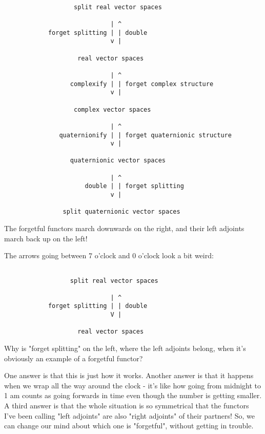 \begin{verbatim}

                   split real vector spaces
  
                             | ^
            forget splitting | | double
                             v |
                   
                    real vector spaces

                             | ^
                  complexify | | forget complex structure
                             v |

                   complex vector spaces

                             | ^
               quaternionify | | forget quaternionic structure
                             v |

                  quaternionic vector spaces
  
                             | ^
                      double | | forget splitting
                             v |

                split quaternionic vector spaces

\end{verbatim}
    
The forgetful functors march downwards on the right, and their
left adjoints march back up on the left!

The arrows going between 7 o'clock and 0 o'clock look a bit weird:

       
\begin{verbatim}

                  split real vector spaces
  
                             | ^
            forget splitting | | double
                             V |
                   
                    real vector spaces

\end{verbatim}
    

Why is "forget splitting" on the left, where the left adjoints belong, when 
it's obviously an example of a forgetful functor?  

One answer is that this is just how it works.  Another answer is that it 
happens when we wrap all the way around the clock - it's like how going from 
midnight to 1 am counts as going forwards in time even though the number is 
getting smaller.  A third answer is that the whole situation is so symmetrical 
that the functors I've been calling "left adjoints" are also "right adjoints" of
their partners!   So, we can change our mind about which one is "forgetful",
without getting in trouble.

